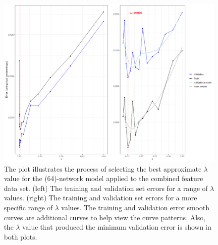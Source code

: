 \begin{figure}[]
	\begin{center}
		\includegraphics[scale = 0.5]{fig/CH3/all_mod_2_lambda_plot.png}
		\caption{The plot illustrates the process of selecting the best approximate $\lambda$ value for the (64)-network model applied to the combined feature data set. (left) The training and validation set errors for a range of $\lambda$ values. (right) The training and validation set errors for a more specific range of $\lambda$ values. The training and validation error smooth curves are additional curves to help view the curve patterns. Also, the $\lambda$ value that produced the minimum validation error is shown in both plots.}
		\label{fig:ch3_nn_validation_mod2_all}
	\end{center}	
\end{figure}

